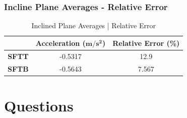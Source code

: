 \documentclass[a4paper,12pt]{article}
\begin{document}
\subsubsection{Incline Plane Averages - Relative Error}
\begin{table}[H]
\centering
\begin{tabular}{@{}ccc@{}}
\toprule
 & \textbf{Acceleration ($\boldsymbol{m/s^2}$)} & \textbf{Relative Error (\%)} \\ \midrule
\textbf{SFTT} & -0.5317 & 12.9 \\
\textbf{SFTB} & -0.5643 & 7.567 \\ \bottomrule

\end{tabular}
\caption{Inclined Plane Averages | Relative Error}
\label{tab:ip-re}
\end{table}





 \section{Questions}

\vspace{-0.5cm}
\singlespacing
\end{document}
